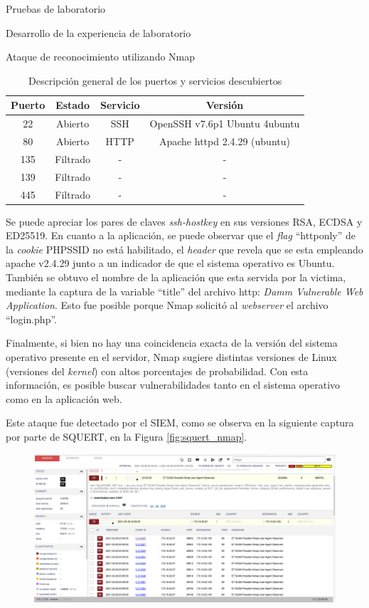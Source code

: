 \begin{section}{Pruebas de laboratorio}
\begin{subsection}{Desarrollo de la experiencia de laboratorio}
\begin{subsubsection}{Ataque de reconocimiento utilizando Nmap}
\begin{table}[H]
{    \begin{tabular}{|c|c|c|c|} 
    \hline
    Puerto &  Estado  & Servicio & Versión \\
    \hline
    22 & Abierto & SSH & OpenSSH v7.6p1 Ubuntu 4ubuntu \\
    \hline
    80 & Abierto & HTTP & Apache httpd 2.4.29 (ubuntu) \\
    \hline
    135 & Filtrado & - & - \\
    \hline
    139 & Filtrado & -  & - \\
    \hline
    445 & Filtrado & -  & - \\
    \hline %
    \end{tabular}
    }
    \caption{Descripción general de los puertos y servicios descubiertos}
    \label{table_17}
    \end{table}
    \FloatBarrier
    Se puede apreciar los pares de claves \textit{ssh-hostkey} en sus versiones RSA, ECDSA y ED25519. En cuanto a la aplicación, se puede observar que el \textit{flag} “httponly” de la \textit{cookie} PHPSSID no está habilitado, el \textit{header} que revela que se esta empleando apache v2.4.29 junto a un indicador de que el sistema operativo es Ubuntu. También se obtuvo el nombre de la aplicación que esta servida por la victima, mediante la captura de la variable “title” del archivo http: \textit{Damm Vulnerable Web Application}. Esto fue posible porque Nmap solicitó al \textit{webserver} el archivo “login.php”.\par
    Finalmente, si bien no hay una coincidencia exacta de la versión del sistema operativo presente en el servidor, Nmap sugiere distintas versiones de Linux  (versiones del \textit{kernel}) con altos porcentajes de probabilidad. Con esta información, es posible buscar vulnerabilidades tanto en el sistema operativo como en la aplicación web.\par
    Este ataque fue detectado por el SIEM, como se observa en la siguiente captura por parte de SQUERT, en la Figura \ref{fig:squert_nmap}.
    \begin{figure}[H]
    \centering
    \includegraphics[width=1\textwidth]{./iteracion_3_imagenes/squert-NMAP.png}

\end{figure}
\end{subsubsection}
\end{subsection}
\end{section}
